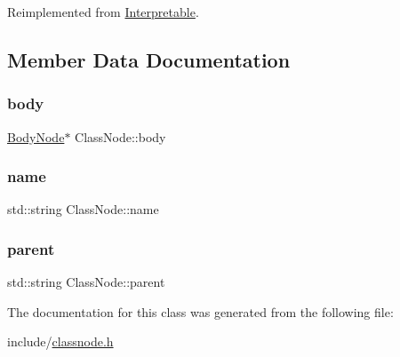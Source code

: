 Reimplemented from \hyperlink{classInterpretable_a32f547aaf68dcbab993284d3257ab010}{Interpretable}.



\subsection{Member Data Documentation}
\mbox{\label{classClassNode_ad5c089e050c2c7da583376fe16762689}} 
\subsubsection{\texorpdfstring{body}{body}}
{\footnotesize\ttfamily \hyperlink{classBodyNode}{Body\+Node}$\ast$ Class\+Node\+::body}

\mbox{\label{classClassNode_a1fc3152f6442b5f6913ec72f26afacbe}} 
\subsubsection{\texorpdfstring{name}{name}}
{\footnotesize\ttfamily std\+::string Class\+Node\+::name}

\mbox{\label{classClassNode_a844a82eec88057b0faaf203f5a60a301}} 
\subsubsection{\texorpdfstring{parent}{parent}}
{\footnotesize\ttfamily std\+::string Class\+Node\+::parent}



The documentation for this class was generated from the following file\+:\begin{DoxyCompactItemize}
\item 
include/\hyperlink{classnode_8h}{classnode.\+h}\end{DoxyCompactItemize}
